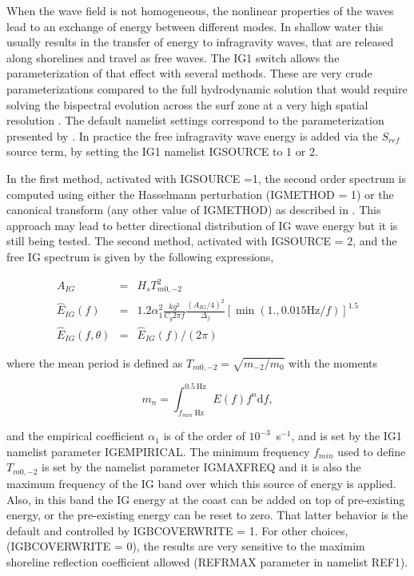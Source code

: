 When the wave field is not homogeneous, the nonlinear properties of the waves
lead to an exchange of energy between different modes. In shallow water this
usually results in the transfer of energy to infragravity waves, that are
released along shorelines and travel as free waves. The {\code IG1} switch
allows the parameterization of that effect with several methods.  These are
very crude parameterizations compared to the full hydrodynamic solution that
would require solving the bispectral evolution across the surf zone at a very
high spatial resolution \citep[e.g.][]{art:HB97}. The default namelist settings
correspond to the parameterization presented by \cite{art:Aea14}.
 In practice the free infragravity wave energy is
added via the $S_{ref}$ source term, by setting the {\code IG1} namelist
{\code IGSOURCE} to 1 or 2.

In the first method, activated with {\code IGSOURCE =1}, the second order
spectrum is computed using either the Hasselmann perturbation ({\code IGMETHOD
= 1}) or the canonical transform (any other value of {\code IGMETHOD}) as described 
in \cite{art:Jan09}. This
approach may lead to better directional distribution of IG wave energy but it
is still being tested.  The second method, activated with {\code IGSOURCE =
2}, and the free IG spectrum is given by the following expressions,

\begin{eqnarray}
 A_{IG} & =&    H_s T_{m0,-2}^2\label{eq:IGfit0} \\
\widehat{E}_{IG}(f)& = & 1.2 \alpha_1^2 \frac{k g^2}{C_g 2 \pi f} \frac{(A_{IG}/4)^2}{\Delta_f}  
\left[\min( 1., 0.015\mathrm{Hz}/ f)\right]^{1.5} \label{eq:IGfit1} \\
 \widehat{E}_{IG}(f,\theta) & = & \widehat{E}_{IG}(f) / (2 \pi )
\label{eq:fit2} 
\end{eqnarray}

\noindent
where the mean period is defined as $ T_{m0,-2} =\sqrt{m_{-2}/m_{0}}$ with the
moments

\begin{equation}
 m_n= \int_{f_{min}~\mathrm{Hz}}^{0.5~\mathrm{Hz}} E(f) f^n {\mathrm d}f,\label{eq:mn}
\end{equation}

\noindent
and the empirical coefficient $\alpha_1$ is of the order of
$10^{-3}$~s$^{-1}$, and is set by the IG1 namelist parameter {\code
IGEMPIRICAL}. The minimum frequency $f_{min}$ used to define $ T_{m0,-2}$ is
set by the namelist parameter {\code IGMAXFREQ} and it is also the maximum
frequency of the IG band over which this source of energy is applied.  Also,
in this band the IG energy at the coast can be added on top of pre-existing
energy, or the pre-existing energy can be reset to zero. That latter behavior
is the default and controlled by {\code IGBCOVERWRITE = 1}. For other choices,
({\code IGBCOVERWRITE = 0}), the results are very sensitive to the maximim
shoreline reflection coefficient allowed ({\code REFRMAX} parameter in
namelist {\code REF1}).

